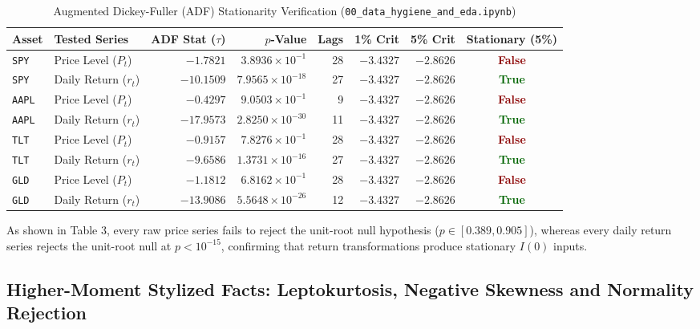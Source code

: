 \documentclass[11pt,a4paper]{article}
\begin{document}
\begin{table}[H]
\centering
\caption{Augmented Dickey-Fuller (ADF) Stationarity Verification (\texttt{00\_data\_hygiene\_and\_eda.ipynb})}
\small
\begin{tabular}{llrrrrrc}
\toprule
\textbf{Asset} & \textbf{Tested Series} & \textbf{ADF Stat ($\tau$)} & \textbf{$p$-Value} & \textbf{Lags} & \textbf{1\% Crit} & \textbf{5\% Crit} & \textbf{Stationary (5\%)} \\
\midrule
\texttt{SPY}  & Price Level ($P_t$)  & $-1.7821$ & $3.8936 \times 10^{-1}$ & 28 & $-3.4327$ & $-2.8626$ & \textcolor{darkred}{\textbf{False}} \\
\texttt{SPY}  & Daily Return ($r_t$) & $-10.1509$ & $7.9565 \times 10^{-18}$ & 27 & $-3.4327$ & $-2.8626$ & \textcolor{darkgreen}{\textbf{True}} \\
\texttt{AAPL} & Price Level ($P_t$)  & $-0.4297$ & $9.0503 \times 10^{-1}$ & 9  & $-3.4327$ & $-2.8626$ & \textcolor{darkred}{\textbf{False}} \\
\texttt{AAPL} & Daily Return ($r_t$) & $-17.9573$ & $2.8250 \times 10^{-30}$ & 11 & $-3.4327$ & $-2.8626$ & \textcolor{darkgreen}{\textbf{True}} \\
\texttt{TLT}  & Price Level ($P_t$)  & $-0.9157$ & $7.8276 \times 10^{-1}$ & 28 & $-3.4327$ & $-2.8626$ & \textcolor{darkred}{\textbf{False}} \\
\texttt{TLT}  & Daily Return ($r_t$) & $-9.6586$  & $1.3731 \times 10^{-16}$ & 27 & $-3.4327$ & $-2.8626$ & \textcolor{darkgreen}{\textbf{True}} \\
\texttt{GLD}  & Price Level ($P_t$)  & $-1.1812$ & $6.8162 \times 10^{-1}$ & 28 & $-3.4327$ & $-2.8626$ & \textcolor{darkred}{\textbf{False}} \\
\texttt{GLD}  & Daily Return ($r_t$) & $-13.9086$ & $5.5648 \times 10^{-26}$ & 12 & $-3.4327$ & $-2.8626$ & \textcolor{darkgreen}{\textbf{True}} \\
\bottomrule
\end{tabular}
\end{table}

As shown in Table 3, every raw price series fails to reject the unit-root null hypothesis ($p \in [0.389, 0.905]$), whereas every daily return series rejects the unit-root null at $p < 10^{-15}$, confirming that return transformations produce stationary $I(0)$ inputs.

\subsection{Higher-Moment Stylized Facts: Leptokurtosis, Negative Skewness and Normality Rejection}
\end{document}
